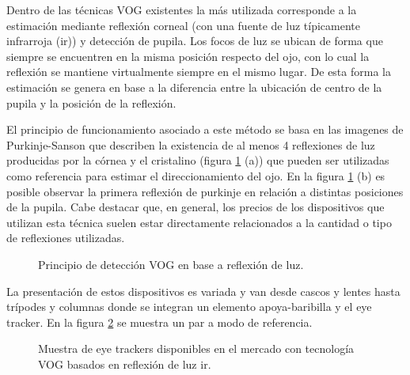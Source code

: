 \documentclass[../main.tex]{subfiles}
\begin{document}
\begin{enumerate}
					Dentro de las técnicas VOG existentes la más utilizada corresponde a la estimación mediante reflexión corneal (con una fuente de luz típicamente infrarroja (\acrshort{ir})) y detección de pupila. Los focos de luz se ubican de forma que siempre se encuentren en la misma posición respecto del ojo, con lo cual la reflexión se mantiene virtualmente siempre en el mismo lugar. De esta forma la estimación se genera en base a la diferencia entre la ubicación de centro de la pupila y la posición de la reflexión.  

					El principio de funcionamiento asociado a este método se basa en las imagenes de Purkinje-Sanson que describen la existencia de al menos 4 reflexiones de luz producidas por la córnea y el cristalino (figura \ref{fig:02_et_vog1} (a)) que pueden ser utilizadas como referencia para estimar el direccionamiento del ojo. En la figura \ref{fig:02_et_vog1} (b) es posible observar la primera reflexión de purkinje en relación a distintas posiciones de la pupila. Cabe destacar que, en general, los precios de los dispositivos que utilizan esta técnica suelen estar directamente relacionados a la cantidad o tipo de reflexiones utilizadas.
					\begin{figure}[H]
						\centering
						\hspace{5mm}
						\caption{Principio de detección VOG en base a reflexión de luz\cite{dissertation:eyetrackers}.}
						\label{fig:02_et_vog1}
					\end{figure}

					La presentación de estos dispositivos es variada y van desde cascos y lentes hasta trípodes y columnas donde se integran un elemento apoya-baribilla y el eye tracker. En la figura \ref{fig:02_et_vog2} se muestra un par a modo de referencia. 
					\begin{figure}[H]
						\centering
						\hspace{5mm}
						\caption{Muestra de eye trackers disponibles en el mercado con tecnología VOG basados en reflexión de luz \acrshort{ir}.}
						\label{fig:02_et_vog2}
					\end{figure}  

				\end{enumerate}
\end{document}

